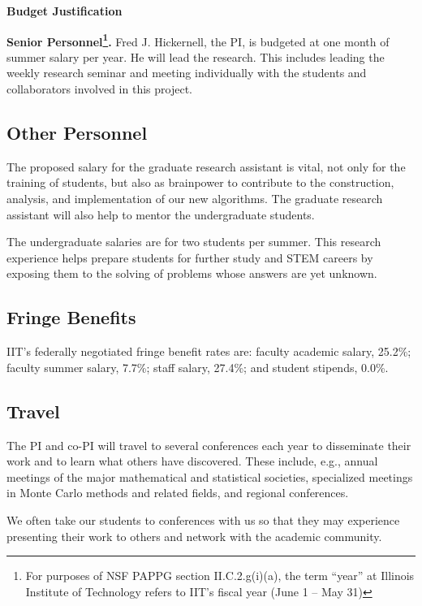 \documentclass[11pt]{NSFamsart}
\begin{document}

\centerline{\textbf{\Large Budget Justification}}

\bigskip

\noindent\textbf{Senior Personnel\footnote{For purposes of NSF PAPPG section II.C.2.g(i)(a), the term “year” at Illinois Institute of Technology refers to IIT’s fiscal year (June 1 -- May 31)}.}
Fred J. Hickernell, the PI, is budgeted at one month of summer salary per year.  He will lead the research.  This includes leading the weekly research seminar and  meeting individually with the 
students and collaborators involved in this project.

\subsection*{Other Personnel}
The proposed salary for the graduate research assistant is vital, not only for the training of students, 
but also as brainpower to contribute to the construction, analysis, and implementation of our new 
algorithms.  The graduate research assistant will also help to mentor the undergraduate students.

The undergraduate salaries are for two students per summer.  This research experience helps 
prepare students for further study and STEM careers by exposing them to the solving of problems 
whose answers are yet unknown.

\subsection*{Fringe Benefits}
IIT’s federally negotiated fringe benefit rates are: faculty academic salary, 25.2\%; faculty summer salary, 7.7\%; staff salary, 27.4\%; and student stipends, 0.0\%.

\subsection*{Travel}
The PI and co-PI will travel to several conferences each year to disseminate their work and to learn 
what others have discovered.  These include, e.g., annual meetings of the major mathematical and 
statistical societies, specialized meetings in Monte Carlo methods and related fields, and regional 
conferences. 

We often take our students to conferences with us so that they may  experience 
presenting their work to others and network with the academic community.
\end{document}
